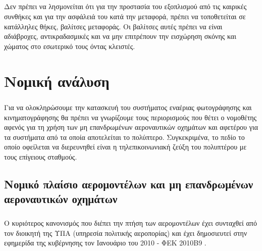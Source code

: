 \documentclass[a4paper, 12pt, twoside]{report}
\begin{document}
{{{{{{			\paragraph{}{Δεν πρέπει να λησμονείται ότι για την προστασία του εξοπλισμού από τις καιρικές συνθήκες και για την ασφάλειά του κατά την μεταφορά, πρέπει να τοποθετείται σε κατάλληλες θήκες, βαλίτσες μεταφοράς. Οι βαλίτσες αυτές πρέπει να είναι αδιάβροχες, αντικραδασμικές και να μην επιτρέπουν την εισχώρηση σκόνης και χώματος στο εσωτερικό τους όντας κλειστές.
			}
	
	\chapter{Νομική ανάλυση}
		
		\paragraph{}{Για να ολοκληρώσουμε την κατασκευή του συστήματος εναέριας φωτογράφησης και κινηματογράφησης θα πρέπει να γνωρίζουμε τους περιορισμούς που θέτει ο νομοθέτης αφενός για τη χρήση των μη επανδρωμένων αεροναυτικών οχημάτων και αφετέρου για τα συστήματα από τα οποία αποτελείται το πολύπτερο. Συγκεκριμένα, το πεδίο το οποίο οφείλεται να διερευνηθεί είναι η τηλεπικοινωνιακή ζεύξη του πολυπτέρου με τους επίγειους σταθμούς. 
			}
			
		\section{Νομικό πλαίσιο αερομοντέλων και μη επανδρωμένων αεροναυτικών οχημάτων}
			
			\paragraph{}{Ο κυριότερος κανονισμός που διέπει την πτήση των αερομοντέλων έχει συνταχθεί από τον διοικητή της ΥΠΑ (υπηρεσία πολιτικής αεροπορίας) και έχει δημοσιευτεί στην εφημερίδα της κυβέρνησης τον Ιανουάριο του 2010 - ΦΕΚ 2010Β9 \cite{ΦΕΚ2010Β9}.
			}
}}}}}}
\end{document}
